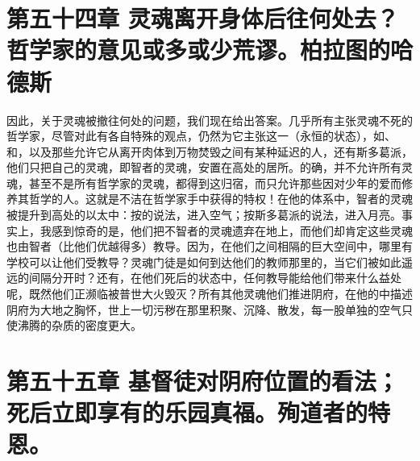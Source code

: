 
\section{第五十四章 灵魂离开身体后往何处去？哲学家的意见或多或少荒谬。柏拉图的哈德斯}

因此，关于灵魂被撤往何处的问题，我们现在给出答案。几乎所有主张灵魂不死的哲学家，尽管对此有各自特殊的观点，仍然为它主张这一（永恒的状态），如、和，以及那些允许它从离开肉体到万物焚毁之间有某种延迟的人，还有斯多葛派，他们只把自己的灵魂，即智者的灵魂，安置在高处的居所。的确，并不允许所有灵魂，甚至不是所有哲学家的灵魂，都得到这归宿，而只允许那些因对少年的爱而修养其哲学的人。这就是不洁在哲学家手中获得的特权！在他的体系中，智者的灵魂被提升到高处的以太中：按的说法，进入空气；按斯多葛派的说法，进入月亮。事实上，我感到惊奇的是，他们把不智者的灵魂遗弃在地上，而他们却肯定这些灵魂也由智者（比他们优越得多）教导。因为，在他们之间相隔的巨大空间中，哪里有学校可以让他们受教导？灵魂门徒是如何到达他们的教师那里的，当它们被如此遥远的间隔分开时？还有，在他们死后的状态中，任何教导能给他们带来什么益处呢，既然他们正濒临被普世大火毁灭？所有其他灵魂他们推进阴府，在他的中描述阴府为大地之胸怀，世上一切污秽在那里积聚、沉降、散发，每一股单独的空气只使沸腾的杂质的密度更大。\par


\section{第五十五章 基督徒对阴府位置的看法；死后立即享有的乐园真福。殉道者的特恩。}

